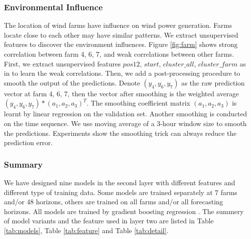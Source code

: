 \documentclass[conference]{IEEEtran}
\begin{document}
\subsubsection{Environmental Influence}
The location of wind farms have influence on wind power generation. Farms locate close to each other may have similar patterns. We extract unsupervised features to discover the environment influences. Figure \ref{fig:farm} shows strong correlation between farm 4, 6, 7, and weak correlations between other farms. First, we extract unsupervised features $pos12$, $start$, $cluster\_all$, $cluster\_farm$ as in \cite{SILVA2014395} to learn the weak correlations. Then, we add a post-processing procedure to smooth the output of the predictions. Denote $(y_4, y_6, y_7)$ as the raw prediction vector at farm 4, 6, 7, then the vector after smoothing is the weighted average $(y_4, y_6, y_7)*(a_1,a_2,a_3)^T$. The smoothing coefficient matrix $(a_1,a_2,a_3)$ is learnt by linear regression on the validation set. Another smoothing is conducted on the time sequence. We use moving average of a 3-hour window size to smooth the predictions. Experiments show the smoothing trick can always reduce the prediction error. 

\subsubsection{Summary}
We have designed nine models in the second layer with different features and different type of training data. Some models are trained separately at 7 farms and/or 48 horizons, others are trained on all farms and/or all forecasting horizons. All models are trained by gradient boosting regression \cite{DBLP:journals/corr/ChenG16}. The summery of model variants and the feature used in layer two are listed in Table \ref{tab:models}, Table \ref{tab:feature} and Table \ref{tab:detail}. 
\begin{table}
\caption {Prediction Models in the Second Layer}
\begin{center}
\label{tab:models}
\end{center}
\vspace*{-1mm}
\end{table}
\end{document}
